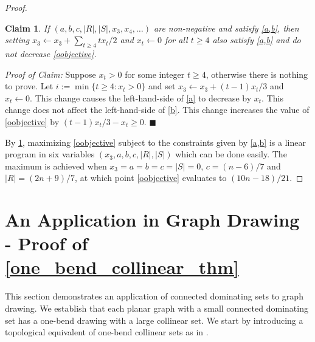 \documentclass{article}
\newtheorem{clm}{Claim}
\newenvironment{clmproof}{\noindent\emph{Proof of Claim:}}{\hfill{$\blacksquare$}\par}
\theoremstyle{definition}
\begin{document}
\begin{proof}
  \begin{clm}\label{simplify}
    If $(a,b,c,|R|,|S|,x_3,x_4,\ldots)$ are non-negative and satisfy \cref{a,b}, then setting $x_3\gets x_3+\sum_{t\ge 4}tx_t/2$ and $x_t\gets 0$ for all $t\ge 4$ also satisfy \cref{a,b} and do not decrease \cref{oobjective}.
  \end{clm}

  \begin{clmproof}
    Suppose $x_t>0$ for some integer $t\ge 4$, otherwise there is nothing to prove.  Let $i:=\min\{t\ge 4: x_t>0\}$ and set $x_3\gets x_3+(t-1)x_t/3$ and $x_t\gets 0$. This change causes the left-hand-side of \cref{a} to decrease by $x_t$. This change does not affect the left-hand-side of \cref{b}.  This change increases the value of \cref{oobjective} by $(t-1)x_t/3-x_t\ge 0$.
  \end{clmproof}

  By \cref{simplify}, maximizing \cref{oobjective} subject to the constraints given by \cref{a,b} is a linear program in six variables $(x_3,a,b,c,|R|,|S|)$ which can be done easily.  The maximum is achieved when $x_3=a=b=c=|S|=0$, $c=(n-6)/7$ and $|R|=(2n+9)/7$, at which point \cref{oobjective} evaluates to $(10n-18)/21$.
\end{proof}



\section{An Application in Graph Drawing - Proof of \cref{one_bend_collinear_thm}}
\label{one_bend}
This section demonstrates an application of connected dominating sets to graph drawing. We establish that each planar graph with a small connected dominating set has a one-bend drawing with a large collinear set. We start by introducing a topological equivalent of one-bend collinear sets as in \cite{DBLP:journals/jocg/LozzoDFMR18}.


\end{document}
